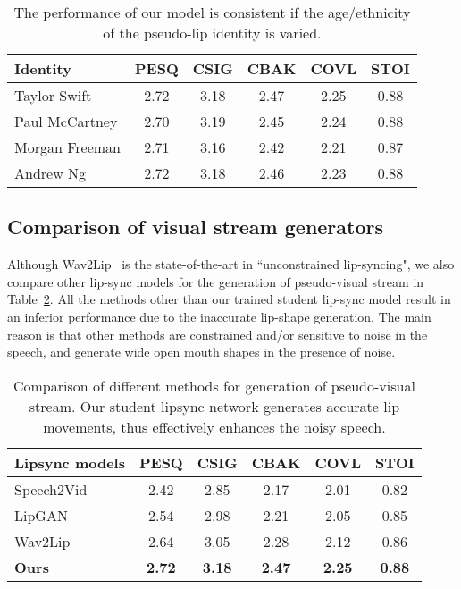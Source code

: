 \documentclass[10pt,twocolumn,letterpaper]{article}
\begin{document}
\begin{table}[ht]
    \centering
    \setlength{\tabcolsep}{3pt}
    \caption{The performance of our model is consistent if the age/ethnicity of the pseudo-lip identity is varied.}
    \begin{tabular}{lccccc}
    \hline
 
    \textbf{Identity} & \textbf{PESQ} & \textbf{CSIG} & \textbf{CBAK} & \textbf{COVL} & \textbf{STOI}\\
    \hline
    Taylor Swift & 2.72 & 3.18 & 2.47 & 2.25 & 0.88\\
    Paul McCartney  & 2.70 & 3.19 & 2.45 & 2.24 & 0.88\\
    Morgan Freeman & 2.71 & 3.16 & 2.42 & 2.21 & 0.87\\
    Andrew Ng & 2.72 & 3.18 & 2.46 & 2.23 & 0.88\\

    \hline
    
    \end{tabular}
    \label{table:multiple_identities}
\end{table}

\vspace{-10pt}
\subsection{Comparison of visual stream generators}
\label{subsection:diff_visual_stream}

Although Wav2Lip~\cite{wav2lip:2020} is the state-of-the-art in ``unconstrained lip-syncing", we also compare other lip-sync models for the generation of pseudo-visual stream in Table~\ref{table:lip_generation}. All the methods other than our trained student lip-sync model result in an inferior performance due to the inaccurate lip-shape generation. The main reason is that other methods are constrained and/or sensitive to noise in the speech, and generate wide open mouth shapes in the presence of noise.

\begin{table}[ht]
    \centering
    \setlength{\tabcolsep}{3pt}
    \caption{Comparison of different methods for generation of pseudo-visual stream. Our student lipsync network generates accurate lip movements, thus effectively enhances the noisy speech.}
    \begin{tabular}{lccccc}
    \hline
    \textbf{Lipsync models} & \textbf{PESQ} & \textbf{CSIG} & \textbf{CBAK} & \textbf{COVL} & \textbf{STOI}\\
    \hline
    Speech2Vid~\cite{yst_ijcv_2019} & 2.42 & 2.85 & 2.17 & 2.01 & 0.82   \\
    LipGAN~\cite{KR:2019:TAF:3343031.3351066} & 2.54 & 2.98 & 2.21 & 2.05 & 0.85\\
    Wav2Lip~\cite{wav2lip:2020} & 2.64 & 3.05 & 2.28 & 2.12 & 0.86\\
    \textbf{Ours} & \textbf{2.72} & \textbf{3.18} & \textbf{2.47} & \textbf{2.25} & \textbf{0.88}\\

    \hline
    
    \end{tabular}
    \label{table:lip_generation}
\end{table}
\end{document}
